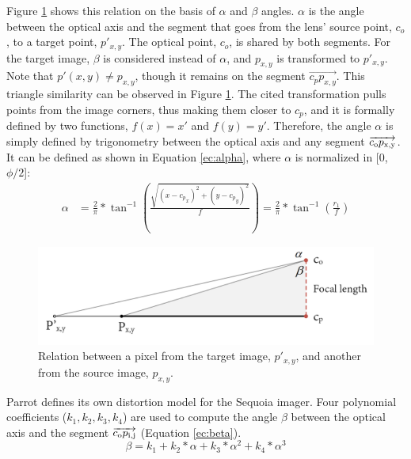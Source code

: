 Figure \ref{fig:fisheye_model} shows this relation on the basis of $\alpha$ and $\beta$ angles. $\alpha$ is the angle between the optical axis and the segment that goes from the lens' source point, $c_o$, to a target point, $p'_{x,y}$. The optical point, $c_o$, is shared by both segments. For the target image, $\beta$ is considered instead of $\alpha$, and $p_{x, y}$ is transformed to $p'_{x,y}$. Note that $p'(x, y) \neq p_{x, y}$, though it remains on the segment $\overrightarrow{c_p p_{x,y}}$. This triangle similarity can be observed in Figure \ref{fig:fisheye_model}. The cited transformation pulls points from the image corners, thus making them closer to $c_p$, and it is formally defined by two functions, $f(x) = x'$ and $f(y) = y'$. Therefore, the angle $\alpha$ is simply defined by trigonometry between the optical axis and any segment $\overrightarrow{c\textsubscript{o}p\textsubscript{x,y}}$. It can be defined as shown in Equation \ref{ec:alpha}, where $\alpha$ is normalized in [0, $\phi / 2$]:
\begin{equation}
\begin{split}
\label{ec:alpha}
\alpha & = \frac{2}{\pi} * \tan^{-1}(\frac{\sqrt{(x-{c_p}_x)^2 + (y-{c_p}_y)^2}}{f}) = \frac{2}{\pi} * \tan^{-1}(\frac{r_1}{f})
\end{split}
\end{equation}

\begin{figure}[ht]
	\centering
	\includegraphics[width=\linewidth]{figs/materials/fisheye_model_2.png}
	\caption{Relation between a pixel from the target image, $p'_{x,y}$, and another from the source image, $p_{x,y}$.}
	\label{fig:fisheye_model}
\end{figure}

Parrot defines its own distortion model for the Sequoia imager. Four polynomial coefficients ($k_1, k_2, k_3, k_4$) are used to compute the angle $\beta$ between the optical axis and the segment $\overrightarrow{c\textsubscript{o}p\textsubscript{i,j}}$ (Equation \ref{ec:beta}).
\begin{equation}
\label{ec:beta}
\beta = k_1 + k_2 * \alpha + k_3 * \alpha ^ 2 + k_4 * \alpha ^ 3
\end{equation}

